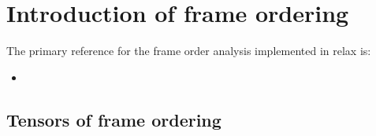 


\section{Introduction of frame ordering}


The primary reference for the frame order analysis implemented in relax is:
\begin{itemize}
  \item {}
\end{itemize}



\subsection{Tensors of frame ordering}

